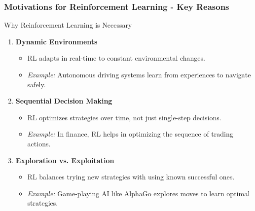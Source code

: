 \documentclass[aspectratio=169]{beamer}
\begin{document}
\begin{frame}[fragile]
    \frametitle{Motivations for Reinforcement Learning - Key Reasons}
    \begin{block}{Why Reinforcement Learning is Necessary}
        \begin{enumerate}
            \item \textbf{Dynamic Environments}
                \begin{itemize}
                    \item RL adapts in real-time to constant environmental changes.
                    \item \textit{Example:} Autonomous driving systems learn from experiences to navigate safely.
                \end{itemize}

            \item \textbf{Sequential Decision Making}
                \begin{itemize}
                    \item RL optimizes strategies over time, not just single-step decisions.
                    \item \textit{Example:} In finance, RL helps in optimizing the sequence of trading actions.
                \end{itemize}

            \item \textbf{Exploration vs. Exploitation}
                \begin{itemize}
                    \item RL balances trying new strategies with using known successful ones.
                    \item \textit{Example:} Game-playing AI like AlphaGo explores moves to learn optimal strategies.
                \end{itemize}
        \end{enumerate}
    \end{block}
\end{frame}
\end{document}
